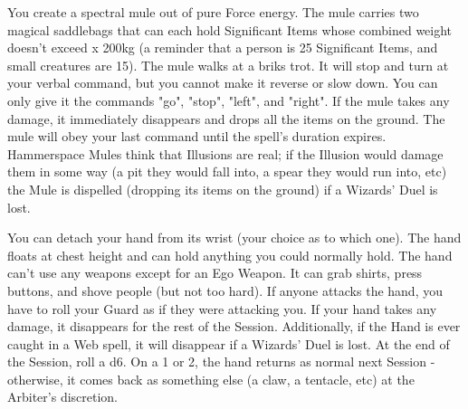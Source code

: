 {\SPELL[
  Name=Hammerspace Mule,
  Link=wizardry-hammerspace-mule,
  Paradigm=Force,
  Save=N,
  Duration=Session,
  Counter=\mylink{Illusion}{wizardry-illusion} ,
  Keywords=Hammerspace,
  Target=Close
]



You create a spectral mule out of pure Force energy. The mule carries two
magical saddlebags that can each hold \SUMDICE Significant Items whose
combined weight doesn't exceed \DICE x 200kg (a reminder that a person is 25
Significant Items, and small creatures are 15).  The mule walks at a briks
trot.  It will stop and turn at your verbal command, but you cannot make it
reverse or slow down. You can only give it the commands "go", "stop",
"left", and "right". If the mule takes any damage, it immediately disappears
and drops all the items on the ground.  The mule will obey your last command
until the spell's duration expires.  Hammerspace Mules think that Illusions
are real; if the Illusion would damage them in some way (a pit they would
fall into, a spear they would run into, etc) the Mule is dispelled (dropping
its items on the ground) if a Wizards' Duel is lost.





\SPELL[
  Name=Helping Hand,
  Link=wizardry-helping-hand,
  Paradigm=Biomancy,
  Save=N,
  Duration=Concentration,
  Counter=\mylink{Web}{wizardry-web} ,
  Keywords=None,
  Target=Self
]



You can detach your hand from its wrist (your choice as to which one).  The
hand floats at chest height and can hold anything you could normally hold. 
The hand can't use any weapons except for an Ego Weapon.  It can grab
shirts, press buttons, and shove people (but not too hard).  If anyone
attacks the hand, you have to roll your Guard as if they were attacking you. 
If your hand takes any damage, it disappears for the rest of the Session. 
Additionally, if the Hand is ever caught in a Web spell, it will disappear
if a Wizards' Duel is lost.  At the end of the Session, roll a d6.  On a 1
or 2, the hand returns as normal next Session - otherwise, it comes back as
something else (a claw, a tentacle, etc) at the Arbiter's discretion.



\SPELL[
  Name=Heroic Leap,
  Link=wizardry-heroic-leap,
  Paradigm=Biomancy,
  Save=N,
  Duration=0,
  Counter=n/a ,
  Keywords=None,
  Target=Self or Close Ally
]



}
